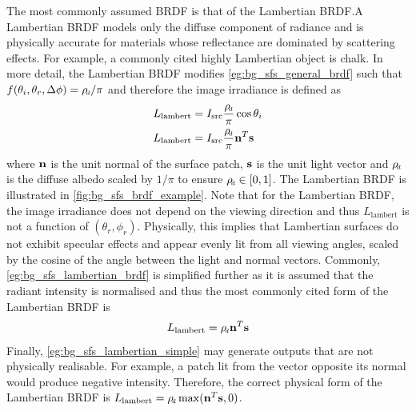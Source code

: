 The most commonly assumed BRDF is that of the Lambertian BRDF.\@ A Lambertian
BRDF models only the diffuse component of radiance and is physically accurate
for materials whose reflectance are dominated by scattering effects. For
example, a commonly cited highly Lambertian object is chalk. In more
detail, the Lambertian BRDF modifies \cref{eg:bg_sfs_general_brdf} such that
$f(\theta_i,\theta_r, \Delta \phi) = \rho_{\smallsub{d}} / \pi$ and therefore
the image irradiance is defined as
\begin{align}\label{eg:bg_sfs_lambertian_brdf}
	L_{\operatorname{lambert}} &= I_{\operatorname{src}} \frac{\rho_{\smallsub{d}}}{\pi} \cos{\theta_i} \\
	L_{\operatorname{lambert}} &= I_{\operatorname{src}} \frac{\rho_{\smallsub{d}}}{\pi} \bb{n}^T \bb{s}
\end{align}
where $\boldsymbol{\mathbf{n}}$ is the unit normal of the surface patch, $\boldsymbol{\mathbf{s}}$ is the unit
light vector and $\rho_{\smallsub{d}}$ is the diffuse albedo scaled by $1/\pi$
to ensure $\rho_{\smallsub{d}} \in [0, 1]$. The Lambertian BRDF is illustrated
in \cref{fig:bg_sfs_brdf_example}. Note that for the Lambertian BRDF, the image
irradiance does not depend on the viewing direction and thus
$L_{\operatorname{lambert}}$ is not a function of $(\theta_r,\phi_r)$.
Physically, this implies that Lambertian surfaces do not exhibit specular
effects and appear evenly lit from all viewing angles, scaled by the cosine
of the angle between the light and normal vectors. Commonly,
\cref{eg:bg_sfs_lambertian_brdf} is simplified further as it is assumed that the
radiant intensity is normalised and thus the most commonly cited form of the
Lambertian BRDF is
\begin{align}\label{eg:bg_sfs_lambertian_simple}
	L_{\operatorname{lambert}} = \rho_{\smallsub{d}} \bb{n}^T \bb{s}
\end{align}
Finally, \cref{eg:bg_sfs_lambertian_simple} may generate outputs that are
not physically realisable. For example, a patch lit from the vector opposite
its normal would produce negative intensity. Therefore, the correct physical
form of the Lambertian BRDF is
$L_{\operatorname{lambert}} = \rho_{\smallsub{d}} \max(\bb{n}^T \bb{s}, 0)$.
